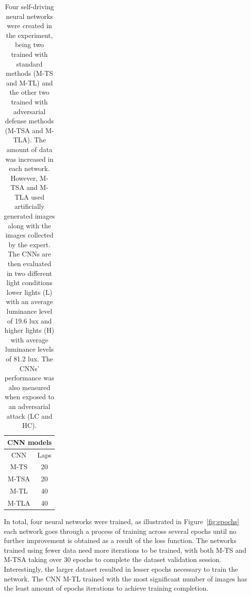\documentclass[12pt]{article}
\begin{document}
\begin{table}[H]
\begin{center}
\begin{tabular}{|c|c|}
 \hline
 \multicolumn{2}{|c|}{CNN models} \\
 \hline
 CNN & Laps  \\
 \hline
 M-TS & 20 \\
 M-TSA & 20 \\
 M-TL & 40 \\
 M-TLA & 40 \\
\hline
\end{tabular}
\caption{\label{tab:allmodels}Four self-driving neural networks were created in the experiment, being two trained with standard methods (M-TS and M-TL) and the other two trained with adversarial defense methods (M-TSA and M-TLA). The amount of data was increased in each network. However, M-TSA and M-TLA used artificially generated images along with the images collected by the expert. The CNNs are then evaluated in two different light conditions lower lights (L) with an average luminance level of 19.6 lux and higher lights (H) with average luminance levels of 81.2 lux. The CNNs' performance was also measured when exposed to an adversarial attack (LC and HC). }
\end{center}
\end{table}

In total, four neural networks were trained, as illustrated in Figure~\ref{fig:epochs} each network goes through a process of training across several epochs until no further improvement is obtained as a result of the loss function. The networks trained using fewer data need more iterations to be trained, with both M-TS and M-TSA taking over 30 epochs to complete the dataset validation session. Interestingly, the larger dataset resulted in lesser epochs necessary to train the network. The CNN M-TL trained with the most significant number of images has the least amount of epochs iterations to achieve training completion.
\end{document}
